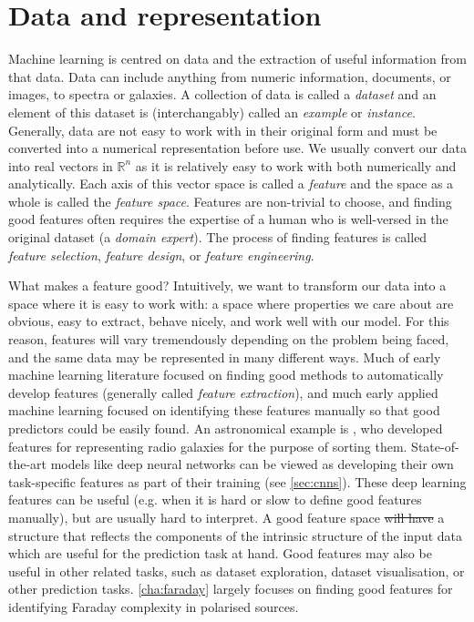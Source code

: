 \documentclass[11pt, a4paper]{book}
\newcommand{\defn}[1]{\emph{#1}}
\providecommand{\DIFaddtex}[1]{{\protect\color{blue}\uwave{#1}}} %
\providecommand{\DIFdeltex}[1]{{\protect\color{red}\sout{#1}}}                      %
\providecommand{\DIFaddbegin}{} %
\providecommand{\DIFaddend}{} %
\providecommand{\DIFdelbegin}{} %
\providecommand{\DIFdelend}{} %
\providecommand{\DIFadd}[1]{\texorpdfstring{\DIFaddtex{#1}}{#1}} %
\providecommand{\DIFdel}[1]{\texorpdfstring{\DIFdeltex{#1}}{}} %
\newcommand{\DIFscaledelfig}{0.5}
\newlength{\DIFdelgraphicswidth} %
\newlength{\DIFdelgraphicsheight} %
\newcommand{\DIFaddincludegraphics}[2][]{{\color{blue}\fbox{\DIFOincludegraphics[#1]{#2}}}} %
\newcommand{\DIFdelincludegraphics}[2][]{%
\sbox{\DIFdelgraphicsbox}{\DIFOincludegraphics[#1]{#2}}%
\settoboxwidth{\DIFdelgraphicswidth}{\DIFdelgraphicsbox} %
\settoboxtotalheight{\DIFdelgraphicsheight}{\DIFdelgraphicsbox} %
\scalebox{\DIFscaledelfig}{%
\parbox[b]{\DIFdelgraphicswidth}{\usebox{\DIFdelgraphicsbox}\\[-\baselineskip] \rule{\DIFdelgraphicswidth}{0em}}\llap{\resizebox{\DIFdelgraphicswidth}{\DIFdelgraphicsheight}{%
\setlength{\unitlength}{\DIFdelgraphicswidth}%
\begin{picture}(1,1)%
\thicklines\linethickness{2pt} %
{\color[rgb]{1,0,0}\put(0,0){\framebox(1,1){}}}%
{\color[rgb]{1,0,0}\put(0,0){\line( 1,1){1}}}%
{\color[rgb]{1,0,0}\put(0,1){\line(1,-1){1}}}%
\end{picture}%
}\hspace*{3pt}}} %
} %
\DeclareRobustCommand{\DIFaddbegin}{\DIFOaddbegin \let\includegraphics\DIFaddincludegraphics} %
\DeclareRobustCommand{\DIFaddend}{\DIFOaddend \let\includegraphics\DIFOincludegraphics} %
\DeclareRobustCommand{\DIFdelbegin}{\DIFOdelbegin \let\includegraphics\DIFdelincludegraphics} %
\DeclareRobustCommand{\DIFdelend}{\DIFOaddend \let\includegraphics\DIFOincludegraphics} %
\begin{document}
\section{Data and representation}
\label{sec:data-and-representation}

    Machine learning is centred on data and the extraction of useful information from that data. Data can include anything from numeric information, documents, or images, to spectra or galaxies. A collection of data is called a \defn{dataset} and an element of this dataset is (interchangably) called an \defn{example} or \defn{instance}. Generally, data are not easy to work with in their original form and must be converted into a numerical representation before use. We usually convert our data into real vectors in $\mathbb R^n$ as it is relatively easy to work with both numerically and analytically. Each axis of this vector space is called a \defn{feature} and the space as a whole is called the \defn{feature space}. Features are non-trivial to choose, and finding good features often requires the expertise of a human who is well-versed in the original dataset (a \defn{domain expert}). The process of finding features is called \defn{feature selection}, \defn{feature design}, or \defn{feature engineering}.

    What makes a feature good? Intuitively, we want to transform our data into a space where it is easy to work with: a space where properties we care about are obvious, easy to extract, behave nicely, and work well with our model. For this reason, features will vary tremendously depending on the problem being faced, and the same data may be represented in many different ways. Much of early machine learning literature focused on finding good methods to automatically develop features (generally called \defn{feature extraction}), and much early applied machine learning focused on identifying these features manually so that good predictors could be easily found. An astronomical example is \citet{proctor06}, who developed features for representing radio galaxies for the purpose of sorting them. State-of-the-art models like deep neural networks \citep[e.g.][]{dieleman15cnn} can be viewed as developing their own task-specific features as part of their training (see \autoref{sec:cnns}). These deep learning features can be useful (e.g. when it is hard or slow to define good features manually), but are usually hard to interpret. A good feature space \DIFdelbegin \DIFdel{will have }\DIFdelend \DIFaddbegin \DIFadd{has }\DIFaddend a structure that reflects the components of the intrinsic structure of the input data which are useful for the prediction task at hand. Good features may also be useful in other related tasks, such as dataset exploration, dataset visualisation, or other prediction tasks. \autoref{cha:faraday} largely focuses on finding good features for identifying Faraday complexity in polarised sources.
\end{document}
